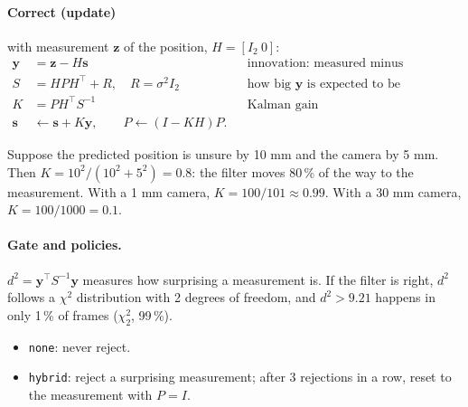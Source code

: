 \documentclass[11pt,a4paper]{article}
\begin{document}
\paragraph{Correct (update)} with measurement $\bm z$ of the position, $H=[I_2\ 0]$:
\begin{align*}
\bm y &= \bm z - H\bm s &&\text{innovation: measured minus predicted}\\
S &= H P H^\top + R,\quad R=\sigma^2 I_2 &&\text{how big $\bm y$ is expected to be}\\
K &= P H^\top S^{-1} &&\text{Kalman gain}\\
\bm s &\leftarrow \bm s + K\bm y,\qquad P\leftarrow (I-KH)P.
\end{align*}

\begin{example}
Suppose the predicted position is unsure by 10 mm and the camera by 5 mm. Then
$K = 10^2/(10^2+5^2) = 0.8$: the filter moves 80\,\% of the way to the measurement. With a 1 mm camera,
$K=100/101\approx0.99$. With a 30 mm camera, $K=100/1000=0.1$.
\end{example}

\paragraph{Gate and policies.}
$d^2=\bm y^\top S^{-1}\bm y$ measures how surprising a measurement is. If the filter is right, $d^2$ follows a
$\chi^2$ distribution with 2 degrees of freedom, and $d^2>9.21$ happens in only 1\,\% of frames ($\chi^2_{2}$, 99\,\%).
\begin{itemize}
\item \texttt{none}: never reject.
\item \texttt{hybrid}: reject a surprising measurement; after 3 rejections in a row, reset to the measurement with $P=I$.
\end{itemize}
\end{document}
